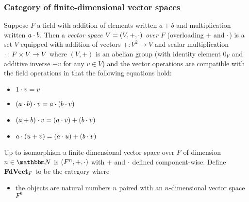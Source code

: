 \subsubsection{Category of finite-dimensional vector spaces}
\label{sec:categories-with-biproducts:fdvect}

\begin{definition}
Suppose $F$ a field with addition of elements written $a + b$ and multiplication written $a \cdot b$. Then a
\emph{vector space $V = (V, +, \cdot)$ over $F$} (overloading $+$ and $\cdot$) is a set $V$ equipped with
addition of vectors $+: V^2 \to V$ and scalar multiplication $\cdot: F \times V \to V$ where $(V,+)$ is an
abelian group (with identity element $0_V$ and additive inverse $-v$ for any $v \in V$) and the vector
operations are compatible with the field operations in that the following equations hold:
\begin{itemize}
\item $1 \cdot v = v$
\item $(a \cdot b) \cdot v = a \cdot (b \cdot v)$
\item $(a + b) \cdot v = (a \cdot v) + (b \cdot v)$
\item $a \cdot (u + v) = (a \cdot u) + (b \cdot v)$
\end{itemize}
\end{definition}

Up to isomorphism a finite-dimensional vector space over $F$ of dimension $n \in \Nat$ is $(F^n, +, \cdot)$
with $+$ and $\cdot$ defined component-wise. Define $\mathbf{FdVect}_F$ to be the category where
\begin{itemize}
\item the objects are natural numbers $n$ paired with an $n$-dimensional vector space $F^n$
\end{itemize}

%
